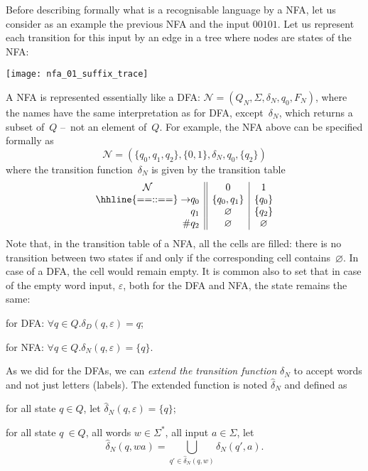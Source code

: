 Before describing formally what is a recognisable language by a NFA,
let us consider as an example the previous NFA and the input
\(00101\). Let us represent each transition for this input by an edge
in a tree where nodes are states of the NFA:
\begin{center}
\texttt{[image: nfa\_01\_suffix\_trace]}
\end{center}
A NFA is represented essentially like a DFA: \(\mathcal{N} = (Q_N,
\Sigma, \delta_N, q_0, F_N)\), where the names have the same
interpretation as for DFA, except~\(\delta_N\), which returns a subset
of~\(Q\) --~not an element of~\(Q\). For example, the NFA above can be
specified formally as
\begin{equation*}
\mathcal{N} = (\{q_0, q_1, q_2\}, \{0, 1\}, \delta_N, q_0, \{q_2\})
\end{equation*}
where the transition function~\(\delta_N\) is given by the transition
table
\begin{equation*}
\begin{array}{r@{}l||c|c}
\multicolumn{2}{c||}{\mathcal{N}} & 0 & 1\\
\hhline{==::==}
\rightarrow & q_0 & \{q_0, q_1\} & \{q_0\}\\
            & q_1 & \varnothing  & \{q_2\}\\
\#          & q_2 & \varnothing  & \varnothing
\end{array}
\end{equation*}
Note that, in the transition table of a NFA, all the cells are filled:
there is no transition between two states if and only if the
corresponding cell contains~\(\varnothing\). In case of a DFA, the
cell would remain empty. It is common also to set that in case of the
empty word input, \(\varepsilon\), both for the DFA and NFA, the state
remains the same:
\begin{itemize*}

  \item for DFA: \(\forall q \in Q.\delta_D (q, \varepsilon) = q\);

  \item for NFA: \(\forall q \in Q.\delta_N (q, \varepsilon) = \{q\}\).

\end{itemize*}
As we did for the DFAs, we can \emph{extend the transition function}
\(\delta_N\) to accept words and not just letters (labels). The
extended function is noted \(\hat{\delta}_N\) and defined as
\begin{itemize*}

  \item for all state \(q \in Q\), let \(\hat{\delta}_N (q,
    \varepsilon) = \{q\}\);

  \item for all state \(q\ \in Q\), all words \(w \in \Sigma^{*}\),
    all input \(a \in \Sigma\), let
    \begin{equation*}
      \hat{\delta}_N (q, wa) =
        \bigcup_{q' \in \hat{\delta}_N (q, w)}{\delta_N  (q', a)}.
    \end{equation*}

\end{itemize*}

